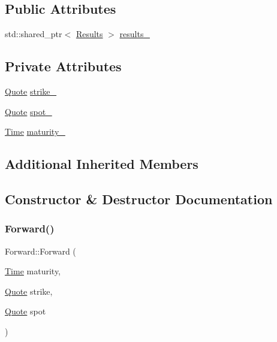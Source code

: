 \subsection*{Public Attributes}
\begin{DoxyCompactItemize}
\item 
std\+::shared\+\_\+ptr$<$ \hyperlink{class_forward_1_1_results}{Results} $>$ \hyperlink{class_forward_abead12e748980177fb67f98bcffbf817}{results\+\_\+}
\end{DoxyCompactItemize}
\subsection*{Private Attributes}
\begin{DoxyCompactItemize}
\item 
\hyperlink{_name_def_8h_a642a6c5fd87319d922637de0e0bb0305}{Quote} \hyperlink{class_forward_a17c32d0a673c13fd92288b1720a43b76}{strike\+\_\+}
\item 
\hyperlink{_name_def_8h_a642a6c5fd87319d922637de0e0bb0305}{Quote} \hyperlink{class_forward_a362d0396ceda462e504f77120339f8b0}{spot\+\_\+}
\item 
\hyperlink{_name_def_8h_ac2d3e0ba793497bcca555c7c2cf64ff3}{Time} \hyperlink{class_forward_ad599104a13c33fbf31e9214af904e9aa}{maturity\+\_\+}
\end{DoxyCompactItemize}
\subsection*{Additional Inherited Members}


\subsection{Constructor \& Destructor Documentation}
\hypertarget{class_forward_a7ec14e1a089290cae0e70c4cddd353b5}{}\label{class_forward_a7ec14e1a089290cae0e70c4cddd353b5} 
\subsubsection{\texorpdfstring{Forward()}{Forward()}}
{\footnotesize\ttfamily Forward\+::\+Forward (\begin{DoxyParamCaption}\item[{\hyperlink{_name_def_8h_ac2d3e0ba793497bcca555c7c2cf64ff3}{Time}}]{maturity,  }\item[{\hyperlink{_name_def_8h_a642a6c5fd87319d922637de0e0bb0305}{Quote}}]{strike,  }\item[{\hyperlink{_name_def_8h_a642a6c5fd87319d922637de0e0bb0305}{Quote}}]{spot }\end{DoxyParamCaption})}



